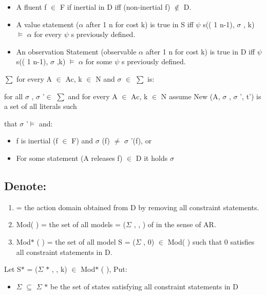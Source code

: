 \documentclass[11pt]{article}
\begin{document}
	\begin{itemize}
		\item A fluent f $ \in $  F if inertial in D iff (non-inertial f) $ \notin $  D.\par
		
		\item A value statement ($ \alpha $  after 1 n for cost k) is true in S iff $ \psi $ s(( 1 n-1), $ \sigma $ , k) $\vDash$  $ \alpha $  for every $ \psi $ s previously defined.\par
		
		\item An observation Statement (observable $ \alpha $  after 1 n for cost k) is true in D iff $ \psi $ s(( 1 n-1), $ \sigma $ ,k) $\vDash$  $ \alpha $  for some $ \psi $ s previously defined.\par
	\end{itemize}
	$ \sum $  for every A $ \in $  Ac, k $ \in $  N and $ \sigma $  $ \in $  $ \sum $  is:\par
	for all $\sigma$ , $\sigma$ \textquoteright $\in$  $\sum$ and for every A $\in$ Ac, k $\in$ N assume New (A, $ \sigma $ , $ \sigma $ \textquoteright, t\textquoteright) is a set of all literals such\par
	that $ \sigma $ \textquoteright $\vDash$  and:\par
	\begin{itemize}
		\item f is inertial (f $ \in $  F) and $ \sigma $ (f) $ \neq $  $ \sigma $ \textquoteright(f), or\par
		
		\item For some statement (A releases f) $ \in $  D it holds $ \sigma $ 
	\end{itemize}\par
	\subsection{Denote:}
	\begin{enumerate}
		\item = the action domain obtained from D by removing all constraint statements.\par
		
		\item Mod( ) = the set of all models = ($  \Sigma  $ , , ) of in the sense of AR.\par
		
		\item Mod$\ast$ ( ) = the set of all model S = ($  \Sigma  $ , 0) $ \in $  Mod( ) such that 0 satisfies all constraint statements in D.
	\end{enumerate}\par
	Let S$\ast$  = ($  \Sigma  $ $\ast$ , , k) $ \in $  Mod$\ast$ ( ), Put:\par
	\begin{itemize}
		\item $  \Sigma  $  $ \subseteq $  $  \Sigma  $ $\ast$  be the set of states satisfying all constraint statements in D
	\end{itemize}\par
\end{document}
